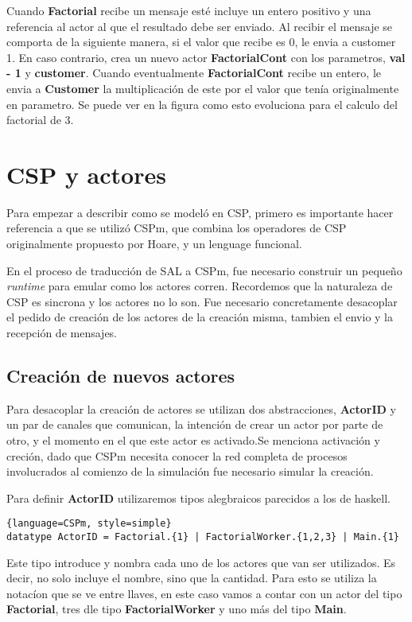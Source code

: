 \documentclass[fleqn]{article}
\begin{document}
Cuando \textbf{Factorial} recibe un mensaje esté incluye un entero positivo y
una referencia al actor al que el resultado debe ser enviado. Al recibir el
mensaje se comporta de la siguiente manera, si el valor que recibe es 0, le
envia a customer 1. En caso contrario, crea un nuevo actor
\textbf{FactorialCont} con los parametros, \textbf{val - 1} y \textbf{customer}.
Cuando eventualmente \textbf{FactorialCont} recibe un entero, le envia a
\textbf{Customer} la multiplicación de este por el valor que tenía originalmente
en parametro. Se puede ver en la figura como esto evoluciona para el calculo del
factorial de 3.

\section{CSP y actores}
Para empezar a describir como se modeló en CSP, primero es importante hacer
referencia a que se utilizó CSPm, que combina los operadores de CSP
originalmente propuesto por Hoare, y un lenguage funcional.

En el proceso de traducción de SAL a CSPm, fue necesario construir un pequeño
\textit{runtime} para emular como los actores corren. Recordemos que la
naturaleza de CSP es sincrona y los actores no lo son. Fue necesario
concretamente desacoplar el pedido de creación de los actores de la creación
misma, tambien el envio y la recepción de mensajes. 

\subsection{Creación de nuevos actores}

Para desacoplar la creación de actores se utilizan dos abstracciones,
\textbf{ActorID} y un par de canales que comunican, la intención de crear un
actor por parte de otro, y el momento en el que este actor es activado.Se
menciona activación y creción, dado que CSPm necesita conocer la red completa
de procesos involucrados al comienzo de la simulación fue necesario simular la creación.

Para definir \textbf{ActorID} utilizaremos tipos alegbraicos parecidos a los de haskell.

\begin{lstlisting}{language=CSPm, style=simple}
datatype ActorID = Factorial.{1} | FactorialWorker.{1,2,3} | Main.{1}
\end{lstlisting}

Este tipo introduce y nombra cada uno de los actores que van ser utilizados. Es
decir, no solo incluye el nombre, sino que la cantidad. Para esto se utiliza la
notacíon que se ve entre llaves, en este caso vamos a contar con un actor del
tipo \textbf{Factorial}, tres dle tipo \textbf{FactorialWorker} y uno más del
tipo \textbf{Main}.
\end{document}
